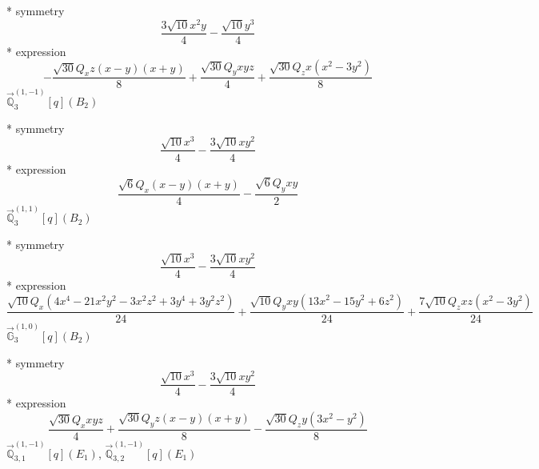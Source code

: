 \documentclass[fleqn,8pt]{jsarticle}
\begin{document}
\noindent\quad ** symmetry
\begin{dmath*}
\frac{3 \sqrt{10} x^{2} y}{4} - \frac{\sqrt{10} y^{3}}{4}
\end{dmath*}
\noindent\quad ** expression
\begin{dmath*}
- \frac{\sqrt{30} Q_{x} z \left(x - y\right) \left(x + y\right)}{8} + \frac{\sqrt{30} Q_{y} x y z}{4} + \frac{\sqrt{30} Q_{z} x \left(x^{2} - 3 y^{2}\right)}{8}
\end{dmath*}
\noindent\quad $\vec{\mathbb{Q}}_{3}^{(1,-1)}[q](B_{2})$

\noindent\quad ** symmetry
\begin{dmath*}
\frac{\sqrt{10} x^{3}}{4} - \frac{3 \sqrt{10} x y^{2}}{4}
\end{dmath*}
\noindent\quad ** expression
\begin{dmath*}
\frac{\sqrt{6} Q_{x} \left(x - y\right) \left(x + y\right)}{4} - \frac{\sqrt{6} Q_{y} x y}{2}
\end{dmath*}
\noindent\quad $\vec{\mathbb{Q}}_{3}^{(1,1)}[q](B_{2})$

\noindent\quad ** symmetry
\begin{dmath*}
\frac{\sqrt{10} x^{3}}{4} - \frac{3 \sqrt{10} x y^{2}}{4}
\end{dmath*}
\noindent\quad ** expression
\begin{dmath*}
\frac{\sqrt{10} Q_{x} \left(4 x^{4} - 21 x^{2} y^{2} - 3 x^{2} z^{2} + 3 y^{4} + 3 y^{2} z^{2}\right)}{24} + \frac{\sqrt{10} Q_{y} x y \left(13 x^{2} - 15 y^{2} + 6 z^{2}\right)}{24} + \frac{7 \sqrt{10} Q_{z} x z \left(x^{2} - 3 y^{2}\right)}{24}
\end{dmath*}
\noindent\quad $\vec{\mathbb{G}}_{3}^{(1,0)}[q](B_{2})$

\noindent\quad ** symmetry
\begin{dmath*}
\frac{\sqrt{10} x^{3}}{4} - \frac{3 \sqrt{10} x y^{2}}{4}
\end{dmath*}
\noindent\quad ** expression
\begin{dmath*}
\frac{\sqrt{30} Q_{x} x y z}{4} + \frac{\sqrt{30} Q_{y} z \left(x - y\right) \left(x + y\right)}{8} - \frac{\sqrt{30} Q_{z} y \left(3 x^{2} - y^{2}\right)}{8}
\end{dmath*}
\noindent\quad $\vec{\mathbb{Q}}_{3,1}^{(1,-1)}[q](E_{1})$, $\vec{\mathbb{Q}}_{3,2}^{(1,-1)}[q](E_{1})$
\end{document}
